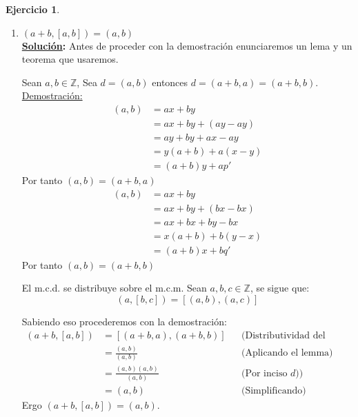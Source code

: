 \documentclass[11pt,letterpaper]{article}
\theoremstyle{definition}\newtheorem{p}{Ejercicio}
\theoremstyle{definition}\newtheorem{pp}[p]{$(*)$Ejercicio}
\numberwithin{p}{section}
\newcommand{\Z}{\mathbb{Z}}
\newcommand{\sol}{\textbf{\underline{Solución}: }} %
\begin{document}
\begin{p}
\begin{enumerate}
  \item $(a+b,[a,b])=(a,b)$\\
  \sol Antes de proceder con la demostración enunciaremos un lema y un teorema que usaremos.
  \begin{lemma}
  Sean $a,b \in \Z$, Sea $d = (a,b)$ entonces $d = (a+b,a) = (a+b,b)$.\\
  \underline{Demostración:} 
  \begin{align*}
  (a,b) &= ax + by\\
    &= ax + by + (ay - ay)\\
    &= ay + by + ax - ay\\
    &= y(a+b) + a(x-y)\\
    &= (a+b)y + ap'
  \end{align*}
  Por tanto $(a,b) = (a+b,a)$
  \begin{align*}
  (a,b)
    &= ax + by\\
    &= ax + by + (bx - bx)\\
    &= ax + bx + by - bx\\
    &= x(a+b) + b(y-x)\\
    &= (a+b)x + bq'
  \end{align*}
  Por tanto $(a,b) = (a+b,b)$
  \end{lemma}

  \begin{theorem}
  El m.c.d. se distribuye sobre el m.c.m. Sean $a,b,c \in \Z$, se sigue que:
  $$(a,[b,c]) = [(a,b),(a,c)]$$
  \end{theorem}
  
  Sabiendo eso procederemos con la demostración:
  \begin{align*}
  (a+b, [a,b])
    &= [(a+b,a), (a+b, b)] && \text{(Distributividad del m.c.d. sobre m.c.m)}\\
    &= \frac{(a,b)}{(a,b)} && \text{(Aplicando el lemma)}\\
    &= \frac{(a,b)(a,b)}{(a,b)} && \text{(Por inciso $d)$)}\\
    &= (a, b) && \text{(Simplificando)}
  \end{align*}
  Ergo $(a+b,[a,b])=(a,b)$.
  
  \end{enumerate}
\end{p}
%
\end{document}
